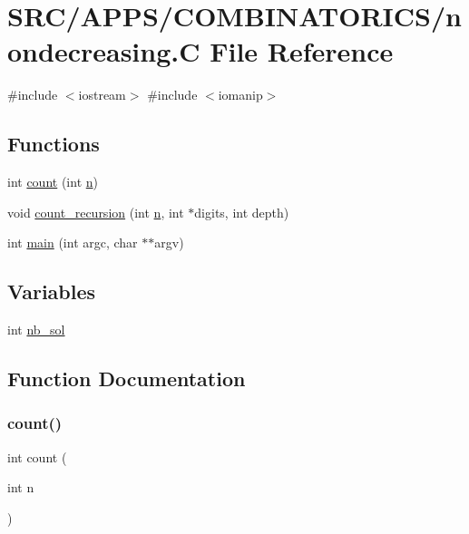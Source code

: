 \hypertarget{nondecreasing_8_c}{}\section{S\+R\+C/\+A\+P\+P\+S/\+C\+O\+M\+B\+I\+N\+A\+T\+O\+R\+I\+C\+S/nondecreasing.C File Reference}
\label{nondecreasing_8_c}
{\ttfamily \#include $<$iostream$>$}\newline
{\ttfamily \#include $<$iomanip$>$}\newline
\subsection*{Functions}
\begin{DoxyCompactItemize}
\item 
int \mbox{\hyperlink{nondecreasing_8_c_aa924f9ef999c8e33f83eb98e56d31784}{count}} (int \mbox{\hyperlink{simeon_8_c_a7f2cd26777ce0ff3fdaf8d02aacbddfb}{n}})
\item 
void \mbox{\hyperlink{nondecreasing_8_c_ad005997745979f6c3f9fa5025786fc43}{count\+\_\+recursion}} (int \mbox{\hyperlink{simeon_8_c_a7f2cd26777ce0ff3fdaf8d02aacbddfb}{n}}, int $\ast$digits, int depth)
\item 
int \mbox{\hyperlink{nondecreasing_8_c_a3c04138a5bfe5d72780bb7e82a18e627}{main}} (int argc, char $\ast$$\ast$argv)
\end{DoxyCompactItemize}
\subsection*{Variables}
\begin{DoxyCompactItemize}
\item 
int \mbox{\hyperlink{nondecreasing_8_c_a8059a1d2e4c33dbffdc8c7cd659a3e4d}{nb\+\_\+sol}}
\end{DoxyCompactItemize}


\subsection{Function Documentation}
\mbox{\label{nondecreasing_8_c_aa924f9ef999c8e33f83eb98e56d31784}} 
\subsubsection{\texorpdfstring{count()}{count()}}
{\footnotesize\ttfamily int count (\begin{DoxyParamCaption}\item[{int}]{n }\end{DoxyParamCaption})}

